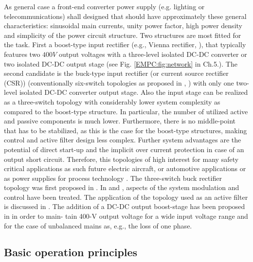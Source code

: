 As  general case a front-end  converter power supply (e.g. lighting or telecommunications) shall designed that should have approximately these general characteristics: sinusoidal main currents, unity power factor, high power density and simplicity of the power circuit structure. Two structures are most fitted for the task. First a boost-type input rectifier (e.g., Vienna rectifier, \cite{kolar1996design}), that typically features two $400V$ output voltages with a three-level isolated  DC-DC  converter  or  two  isolated  DC-DC  output  stage (see Fig. \ref{EMPC:fig:network} in Ch.5.). The second candidate is the buck-type  input  rectifier (or current source rectifier (CSR))  (conventionally  six-switch topologies as proposed in \cite{zargari1993current}, \cite{sato1993state}) with only one two-level isolated  DC-DC  converter  output  stage.  Also the  input  stage  can be realized as a three-switch topology with considerably  lower  system  complexity  as  compared  to  the boost-type structure. In particular, the number of utilized active and passive components is much lower. Furthermore, there is no middle-point that has to be stabilized, as this is the case for the boost-type structures, making control and active filter design less complex. Further system advantages are the potential of direct start-up and the implicit over current protection in case of an output short circuit. Therefore, this topologies of high interest for many safety critical applications as such future electric aircraft, or automotive applications or as power supplies for process technology \cite{nussbaumer2007comprehensive}.
The three-switch buck rectifier topology was first proposed in \cite{malesani1987three}. In \cite{itoh1989steady} and \cite{tooth2000effects}, aspects of the system modulation and control have been treated. The application of the topology used as an active filter is discussed in \cite{salo2005three}.  The addition of a DC-DC output boost-stage has been proposed in \cite{baumannnew} in order to main- tain 400-V output voltage for a wide input voltage range and for the case of unbalanced mains as, e.g., the loss of one phase.

\subsection{Basic operation principles}\label{BASICCSR:sec:OperationPrinciple}

